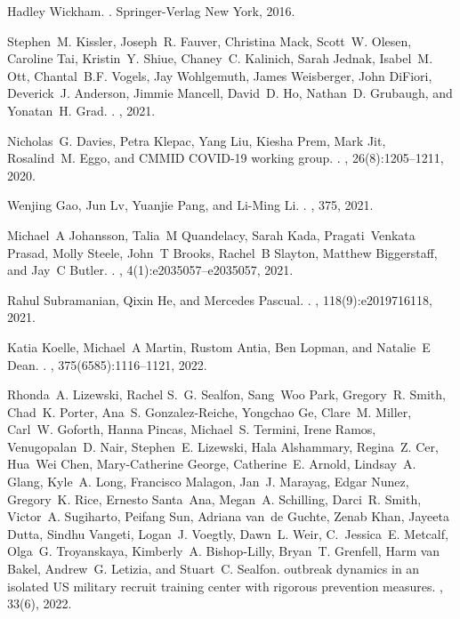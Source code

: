 \documentclass[12pt]{article}
\begin{document}
\begin{thebibliography}{10}
Hadley Wickham.
.
\newblock Springer-Verlag New York, 2016.

Stephen~M. Kissler, Joseph~R. Fauver, Christina Mack, Scott~W. Olesen, Caroline
  Tai, Kristin~Y. Shiue, Chaney~C. Kalinich, Sarah Jednak, Isabel~M. Ott,
  Chantal~B.F. Vogels, Jay Wohlgemuth, James Weisberger, John DiFiori,
  Deverick~J. Anderson, Jimmie Mancell, David~D. Ho, Nathan~D. Grubaugh, and
  Yonatan~H. Grad.
.
, 2021.

Nicholas~G. Davies, Petra Klepac, Yang Liu, Kiesha Prem, Mark Jit, Rosalind~M.
  Eggo, and {CMMID COVID-19 working group}.
.
, 26(8):1205--1211, 2020.

Wenjing Gao, Jun Lv, Yuanjie Pang, and Li-Ming Li.
.
, 375, 2021.

Michael~A Johansson, Talia~M Quandelacy, Sarah Kada, Pragati~Venkata Prasad,
  Molly Steele, John~T Brooks, Rachel~B Slayton, Matthew Biggerstaff, and Jay~C
  Butler.
.
, 4(1):e2035057--e2035057, 2021.

Rahul Subramanian, Qixin He, and Mercedes Pascual.
.
,
  118(9):e2019716118, 2021.

Katia Koelle, Michael~A Martin, Rustom Antia, Ben Lopman, and Natalie~E Dean.
.
, 375(6585):1116--1121, 2022.

Rhonda~A. Lizewski, Rachel S.~G. Sealfon, Sang~Woo Park, Gregory~R. Smith,
  Chad~K. Porter, Ana~S. Gonzalez-Reiche, Yongchao Ge, Clare~M. Miller, Carl~W.
  Goforth, Hanna Pincas, Michael~S. Termini, Irene Ramos, Venugopalan~D. Nair,
  Stephen~E. Lizewski, Hala Alshammary, Regina~Z. Cer, Hua~Wei Chen,
  Mary-Catherine George, Catherine~E. Arnold, Lindsay~A. Glang, Kyle~A. Long,
  Francisco Malagon, Jan~J. Marayag, Edgar Nunez, Gregory~K. Rice, Ernesto
  Santa~Ana, Megan~A. Schilling, Darci~R. Smith, Victor~A. Sugiharto, Peifang
  Sun, Adriana van~de Guchte, Zenab Khan, Jayeeta Dutta, Sindhu Vangeti,
  Logan~J. Voegtly, Dawn~L. Weir, C.~Jessica~E. Metcalf, Olga~G. Troyanskaya,
  Kimberly~A. Bishop-Lilly, Bryan~T. Grenfell, Harm van Bakel, Andrew~G.
  Letizia, and Stuart~C. Sealfon.
 outbreak dynamics in an isolated {US} military recruit
  training center with rigorous prevention measures.
, 33(6), 2022.


\end{thebibliography}
\end{document}
